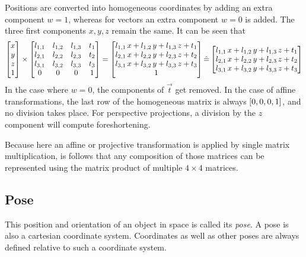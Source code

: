 Positions are converted into homogeneous coordinates by adding an extra component $w = 1$, whereas for vectors an extra component $w = 0$ is added. The three first components $x, y, z$ remain the same. It can be seen that
\begin{equation}
\left[ \begin{matrix}
	x \\ y \\ z \\ 1
\end{matrix} \right] \times  \left[ \begin{matrix}
	l_{1,1} & l_{1,2} & l_{1,3} & t_1 \\
	l_{2,1} & l_{2,2} & l_{2,3} & t_2 \\
	l_{3,1} & l_{3,2} & l_{3,3} & t_3 \\
	0 & 0 & 0 & 1
\end{matrix} \right] = \left[ \begin{matrix}
	l_{1,1} \, x + l_{1,2} \, y + l_{1,3} \, z + t_1 \\
	l_{2,1} \, x + l_{2,2} \, y + l_{2,3} \, z + t_2 \\
	l_{3,1} \, x + l_{3,2} \, y + l_{3,3} \, z + t_3 \\
	1
\end{matrix} \right] \hat{=} \left[ \begin{matrix}
	l_{1,1} \, x + l_{1,2} \, y + l_{1,3} \, z + t_1 \\
	l_{2,1} \, x + l_{2,2} \, y + l_{2,3} \, z + t_2 \\
	l_{3,1} \, x + l_{3,2} \, y + l_{3,3} \, z + t_3 \\
\end{matrix} \right]
\end{equation}
In the case where $w = 0$, the components of $\vec{t}$ get removed. In the case of affine transformations, the last row of the homogeneous matrix is always $\left[0, 0, 0, 1\right]$, and no division takes place. For perspective projections, a division by the $z$ component will compute foreshortening.

Because here an affine or projective transformation is applied by single matrix multiplication, is follows that any composition of those matrices can be represented using the matrix product of multiple $4 \times 4$ matrices.

\subsection{Pose}
This position and orientation of an object in space is called its \emph{pose}. A pose is also a cartesian coordinate system. Coordinates as well as other poses are always defined relative to such a coordinate system.

